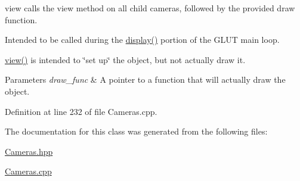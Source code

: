 view calls the view method on all child cameras, followed by the provided draw function. 

Intended to be called during the \hyperlink{ds_8cpp_a4ea013001a5fb47853d0fab8f8de35cd}{display()} portion of the G\-L\-U\-T main loop.

\hyperlink{class_cameras_adeb29c1d639fcfbae4c68017bc8ef4d4}{view()} is intended to \char`\"{}set up\char`\"{} the object, but not actually draw it.


\begin{DoxyParams}{Parameters}
{\em draw\-\_\-func} & A pointer to a function that will actually draw the object. \\
\hline
\end{DoxyParams}


Definition at line 232 of file Cameras.\-cpp.



The documentation for this class was generated from the following files\-:\begin{DoxyCompactItemize}
\item 
\hyperlink{_cameras_8hpp}{Cameras.\-hpp}\item 
\hyperlink{_cameras_8cpp}{Cameras.\-cpp}\end{DoxyCompactItemize}
